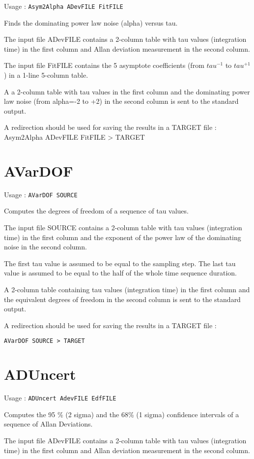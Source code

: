 \documentclass[12pt,a4paper,french]{article}
\begin{document}
Usage : {\tt{Asym2Alpha ADevFILE FitFILE}}

Finds the dominating power law noise (alpha) versus tau.

The input file ADevFILE contains a 2-column table with tau values (integration time) in the first column and Allan deviation measurement in the second column.

The input file FitFILE contains the 5 asymptote coefficients (from $tau^{-1}$ to $tau^{+1}$) in a 1-line 5-column table.

A a 2-column table with tau values in the first column and the dominating power law noise (from alpha=-2 to +2) in the second column is sent to the standard output.

A redirection should be used for saving the results in a TARGET file : Asym2Alpha ADevFILE FitFILE > TARGET

\section{AVarDOF}

Usage : {\tt{AVarDOF SOURCE}}

Computes the degrees of freedom of a sequence of tau values.

The input file SOURCE contains a 2-column table with tau values (integration time) in the first column and the exponent of the power law of the dominating noise in the second column.

The first tau value is assumed to be equal to the sampling step.
The last tau value is assumed to be equal to the half of the whole time sequence duration.

A 2-column table containing tau values (integration time) in the first column and the equivalent degrees of freedom in the second column is sent to the standard output.

A redirection should be used for saving the results in a TARGET file : 

{\tt{AVarDOF SOURCE > TARGET}}

\section{ADUncert}

Usage : {\tt{ADUncert AdevFILE EdfFILE}}

Computes the 95 \% (2 sigma) and the 68\% (1 sigma) confidence intervals of a sequence of Allan Deviations.

The input file ADevFILE contains a 2-column table with tau values (integration time) in the first column and Allan deviation measurement in the second column.
\end{document}
